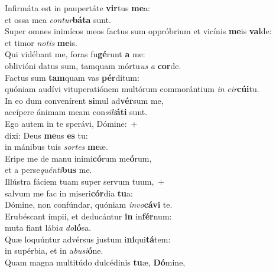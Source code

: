 \oddverse Infirmáta est in paupertáte \textbf{vir}tus \textbf{me}a:~\*\\
\oddverse et ossa mea \textit{con}\textit{tur}\textbf{bá}\textbf{ta} sunt.\\
\evenverse Super omnes inimícos meos factus sum oppróbrium et vicínis \textbf{me}is \textbf{val}de:~\*\\
\evenverse et timor \textit{no}\textit{tis} \textbf{me}is.\\
\oddverse Qui vidébant me, foras fu\textbf{gé}runt \textbf{a} me:~\*\\
\oddverse oblivióni datus sum, tamquam mórtu\textit{us} \textit{a} \textbf{cor}de.\\
\evenverse Factus sum \textbf{tam}quam vas \textbf{pér}ditum:~\*\\
\evenverse quóniam audívi vituperatiónem multórum commorántium \textit{in} \textit{cir}\textbf{cú}\textbf{i}tu.\\
\oddverse In eo dum convenírent \textbf{si}mul ad\textbf{vér}sum me,~\*\\
\oddverse accípere ánimam meam con\textit{si}\textit{li}\textbf{á}\textbf{ti} sunt.\\
\evenverse Ego autem in te sperávi, Dómine:~+\\
\evenverse  dixi: Deus \textbf{me}us \textbf{es} tu:~\*\\
\evenverse in mánibus tuis \textit{sor}\textit{tes} \textbf{me}æ.\\
\oddverse Eripe me de manu inimi\textbf{có}rum me\textbf{ó}rum,~\*\\
\oddverse et a perse\textit{quén}\textit{ti}\textbf{bus} me.\\
\evenverse Illústra fáciem tuam super servum tuum,~+\\
\evenverse  salvum me fac in miseri\textbf{cór}dia \textbf{tu}a:~\*\\
\evenverse Dómine, non confúndar, quóniam \textit{in}\textit{vo}\textbf{cá}\textbf{vi} te.\\
\oddverse Erubéscant ímpii, et deducántur \textbf{in} in\textbf{fér}num:~\*\\
\oddverse muta fiant lábi\textit{a} \textit{do}\textbf{ló}sa.\\
\evenverse Quæ loquúntur advérsus justum i\textbf{ni}qui\textbf{tá}tem:~\*\\
\evenverse in supérbia, et in a\textit{bu}\textit{si}\textbf{ó}ne.\\
\oddverse Quam magna multitúdo dulcédinis \textbf{tu}æ, \textbf{Dó}mine,~\*\\
